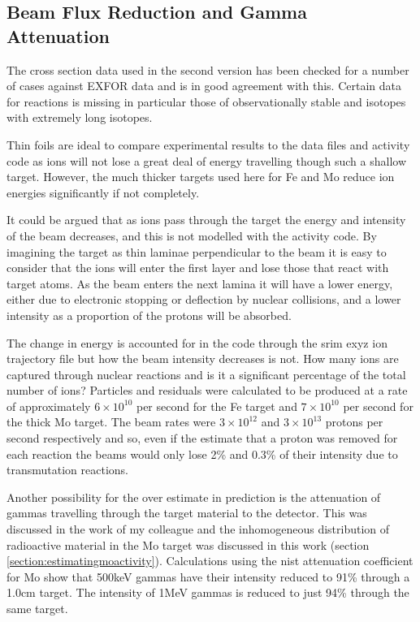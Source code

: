 \subsection{Beam Flux Reduction and Gamma Attenuation}

The cross section data used in the second version has been checked for a number of cases against EXFOR data and is in good agreement with this.  Certain data for reactions is missing in particular those of observationally stable and isotopes with extremely long isotopes.

Thin foils are ideal to compare experimental results to the data files and activity code as ions will not lose a great deal of energy travelling though such a shallow target.  However, the much thicker targets used here for Fe and Mo reduce ion energies significantly if not completely.

It could be argued that as ions pass through the target the energy and intensity of the beam decreases, and this is not modelled with the activity code.  By imagining the target as thin laminae perpendicular to the beam it is easy to consider that the ions will enter the first layer and lose those that react with target atoms.  As the beam enters the next lamina it will have a lower energy, either due to electronic stopping or deflection by nuclear collisions, and a lower intensity as a proportion of the protons will be absorbed.

The change in energy is accounted for in the code through the \acrshort{srim} exyz ion trajectory file but how the beam intensity decreases is not.  How many ions are captured through nuclear reactions and is it a significant percentage of the total number of ions?  Particles and residuals were calculated to be produced at a rate of approximately $6\times10^{10}$ per second for the Fe target and $7\times10^{10}$ per second for the thick Mo target.  The beam rates were $3 \times 10^{12}$ and $3 \times 10^{13}$ protons per second respectively and so, even if the estimate that a proton was removed for each reaction the beams would only lose 2\% and 0.3\% of their intensity due to transmutation reactions.

Another possibility for the over estimate in prediction is the attenuation of gammas travelling through the target material to the detector.  This was discussed in the work of my colleague\cite{johnhewett} and the inhomogeneous distribution of radioactive material in the Mo target was discussed in this work (section \ref{section:estimatingmoactivity}).  Calculations using the \acrshort{nist} attenuation coefficient for Mo show that 500keV gammas have their intensity reduced to 91\% through a 1.0cm target.  The intensity of 1MeV gammas is reduced to just 94\% through the same target.

